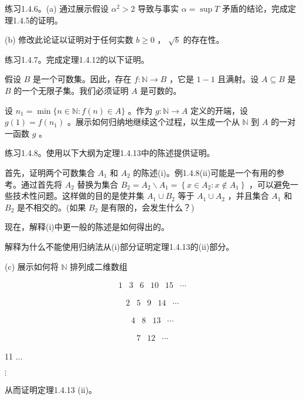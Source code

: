 练习1.4.6。(a) 通过展示假设 \({\alpha }^{2} > 2\) 导致与事实 \(\alpha  = \sup T\) 矛盾的结论，完成定理1.4.5的证明。

(b) 修改此论证以证明对于任何实数 \(b \geq  0\) ， \(\sqrt{b}\) 的存在性。

练习1.4.7。完成定理1.4.12的以下证明。

假设 \(B\) 是一个可数集。因此，存在 \(f : \mathbb{N} \rightarrow  B\) ，它是 \(1 - 1\) 且满射。设 \(A \subseteq  B\) 是 \(B\) 的一个无限子集。我们必须证明 \(A\) 是可数的。

设 \({n}_{1} = \min \{ n \in  \mathbb{N} : f\left( n\right)  \in  A\}\) 。作为 \(g : \mathbb{N} \rightarrow  A\) 定义的开端，设 \(g\left( 1\right)  = f\left( {n}_{1}\right)\) 。展示如何归纳地继续这个过程，以生成一个从 \(\mathbb{N}\) 到 \(A\) 的一对一函数 \(g\) 。

练习1.4.8。使用以下大纲为定理1.4.13中的陈述提供证明。

首先，证明两个可数集合 \({A}_{1}\) 和 \({A}_{2}\) 的陈述(i)。例1.4.8(ii)可能是一个有用的参考。通过首先将 \({A}_{2}\) 替换为集合 \({B}_{2} = {A}_{2} \smallsetminus  {A}_{1} = \left\{  {x \in  {A}_{2} : x \notin  {A}_{1}}\right\}\) ，可以避免一些技术性问题。这样做的目的是使并集 \({A}_{1} \cup  {B}_{2}\) 等于 \({A}_{1} \cup  {A}_{2}\) ，并且集合 \({A}_{1}\) 和 \({B}_{2}\) 是不相交的。(如果 \({B}_{2}\) 是有限的，会发生什么？)

现在，解释(i)中更一般的陈述是如何得出的。

解释为什么不能使用归纳法从(i)部分证明定理1.4.13的(ii)部分。

(c) 展示如何将 \(\mathbb{N}\) 排列成二维数组

\[
\begin{array}{llllll} 1 & 3 & 6 & {10} & {15} & \cdots  \end{array}
\]

\[
\begin{array}{lllll} 2 & 5 & 9 & {14} & \cdots  \end{array}
\]

\[
\begin{array}{llll} 4 & 8 & {13} & \cdots  \end{array}
\]

\[
\begin{array}{lll} 7 & {12} & \cdots  \end{array}
\]

11 ...

\(\vdots\)

从而证明定理1.4.13 (ii)。

